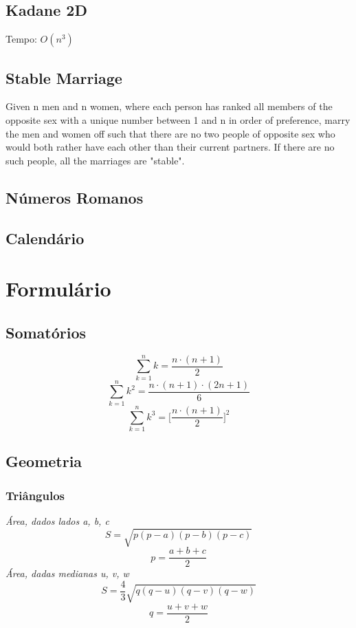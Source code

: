 \documentclass[12pt,a4paper]{article}
\begin{document}
		\subsection{Kadane 2D}
			Tempo: \(O(n^3)\)
		\subsection{Stable Marriage}
			Given n men and n women, where each person has ranked all members of the opposite sex with a unique number between 1 and n in order of preference, marry the men and women off such that there are no two people of opposite sex who would both rather have each other than their current partners. If there are no such people, all the marriages are "stable".
			
		\subsection{Números Romanos}
			
		\subsection{Calendário}
			

	\twocolumn
	\section{Formulário}
		\subsection{Somatórios}
			\[ \sum_{k = 1}^{n} k = \frac{n \cdot (n + 1)}{2} \]
			\[ \sum_{k = 1}^{n} k^2 = \frac{n \cdot (n + 1) \cdot (2n + 1)}{6} \]
			\[ \sum_{k = 1}^{n} k^3 = \bigg[\frac{n \cdot (n + 1)}{2}\bigg]^2 \]
		\subsection{Geometria}
			\subsubsection{Triângulos}
				\emph{Área, dados lados a, b, c}
				\[ S = \sqrt{p (p - a) (p - b) (p - c)} \]
				\[ p = \frac{a + b + c}{2} \]
				\emph{Área, dadas medianas u, v, w}
				\[ S = \frac{4}{3} \sqrt{q (q - u) (q - v) (q - w)} \]
				\[ q = \frac{u + v + w}{2} \]
\end{document}
